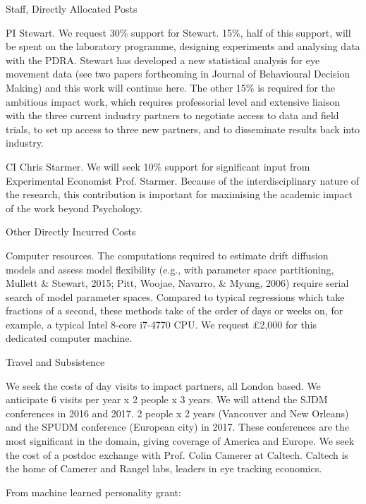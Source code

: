Staff, Directly Allocated Posts

PI Stewart. We request 30\% support for Stewart. 15\%, half of this support, will be spent on
the laboratory programme, designing experiments and analysing data with the PDRA.
Stewart has developed a new statistical analysis for eye movement data (see two papers
forthcoming in Journal of Behavioural Decision Making) and this work will continue here.
The other 15\% is required for the ambitious impact work, which requires professorial level
and extensive liaison with the three current industry partners to negotiate access to data and
field trials, to set up access to three new partners, and to disseminate results back into
industry.

CI Chris Starmer. We will seek 10\% support for significant input from Experimental
Economist Prof. Starmer. Because of the interdisciplinary nature of the research, this
contribution is important for maximising the academic impact of the work beyond
Psychology.


Other Directly Incurred Costs

Computer resources. The computations required to estimate drift diffusion models and assess
model flexibility (e.g., with parameter space partitioning, Mullett & Stewart, 2015; Pitt,
Woojae, Navarro, & Myung, 2006) require serial search of model parameter spaces.
Compared to typical regressions which take fractions of a second, these methods take of the
order of days or weeks on, for example, a typical Intel 8-core i7-4770 CPU. We request
£2,000 for this dedicated computer machine.

Travel and Subsistence

We seek the costs of day visits to impact partners, all London based. We anticipate 6 visits per year x 2 people x 3 years. We will attend the SJDM conferences in 2016 and 2017. 2
people x 2 years (Vancouver and New Orleans) and the SPUDM conference (European city)
in 2017. These conferences are the most significant in the domain, giving coverage of
America and Europe. We seek the cost of a postdoc exchange with Prof. Colin Camerer at
Caltech. Caltech is the home of Camerer and Rangel labs, leaders in eye tracking economics.




From machine learned personality grant:

